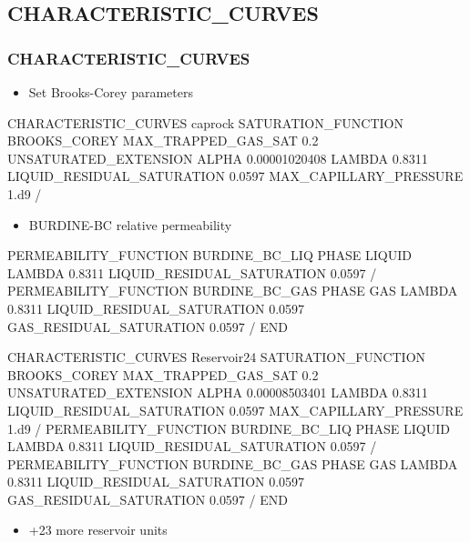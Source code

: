 \documentclass{beamer}
\newcommand\greencomment[1]{{{\color{green} #1}}}
\begin{document}
\subsection{CHARACTERISTIC\_CURVES}

\begin{frame}\frametitle{CHARACTERISTIC\_CURVES}

\begin{itemize}
\item Set Brooks-Corey parameters
\end{itemize}

\begin{semiverbatim}
CHARACTERISTIC_CURVES caprock
  SATURATION_FUNCTION BROOKS_COREY
    \greencomment{MAX_TRAPPED_GAS_SAT 0.2}
    \greencomment{UNSATURATED_EXTENSION}
    ALPHA 0.00001020408
    LAMBDA 0.8311
    LIQUID_RESIDUAL_SATURATION 0.0597
    MAX_CAPILLARY_PRESSURE 1.d9
  / 
\newpage
\begin{itemize}
\item BURDINE-BC relative permeability
\end{itemize}
  PERMEABILITY_FUNCTION BURDINE_BC_LIQ
    PHASE LIQUID
    LAMBDA 0.8311
    LIQUID_RESIDUAL_SATURATION 0.0597
  /
  PERMEABILITY_FUNCTION BURDINE_BC_GAS
    PHASE GAS
    LAMBDA 0.8311
    LIQUID_RESIDUAL_SATURATION 0.0597
    GAS_RESIDUAL_SATURATION 0.0597
  /
END
\end{semiverbatim}

\newpage

\begin{semiverbatim}
CHARACTERISTIC_CURVES Reservoir24
  SATURATION_FUNCTION BROOKS_COREY
    \greencomment{MAX_TRAPPED_GAS_SAT 0.2}
    \greencomment{UNSATURATED_EXTENSION}
    ALPHA 0.00008503401
    LAMBDA 0.8311
    LIQUID_RESIDUAL_SATURATION 0.0597
    MAX_CAPILLARY_PRESSURE 1.d9
  /
\newpage
  PERMEABILITY_FUNCTION BURDINE_BC_LIQ
    PHASE LIQUID
    LAMBDA 0.8311
    LIQUID_RESIDUAL_SATURATION 0.0597
  /
  PERMEABILITY_FUNCTION BURDINE_BC_GAS
    PHASE GAS
    LAMBDA 0.8311
    LIQUID_RESIDUAL_SATURATION 0.0597
    GAS_RESIDUAL_SATURATION 0.0597
  /
END
\end{semiverbatim}

\newpage
\begin{itemize}
  \item +23 more reservoir units
\end{itemize}

\end{frame}
\end{document}
